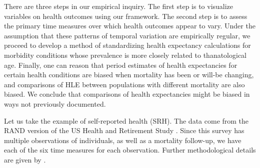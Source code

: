 \documentclass[12pt,oneside,a4paper]{article} %
\theoremstyle{definition}
\begin{document}
There are three steps in our empirical inquiry. The first step is to visualize
variables on health outcomes using our framework. The second step is to
assess the primary time measures over which health outcomes appear to vary.
Under the assumption that these patterns of temporal variation are empirically regular,
we proceed to develop a method of standardizing health expectancy calculations
for morbidity conditions whose prevalence is more closely related
to thanatological age.
Finally, one can reason that period estimates of health expectancies for certain
health conditions are biased when mortality has been or will-be changing, and
comparisons of HLE between populations with different mortality are also biased.
We conclude that comparisons of health expectancies might be biased in ways not
previously documented.

Let us take the example of self-reported health (SRH). %
 The data come from the RAND version of the US Health and Retirement Study \citep{HRS}. Since this
survey has multiple observations of individuals, as well as a mortality
follow-up, we have each of the six time measures for each observation. Further
methodological details are given by \citet{riffe2015ttd}. 
\end{document}
